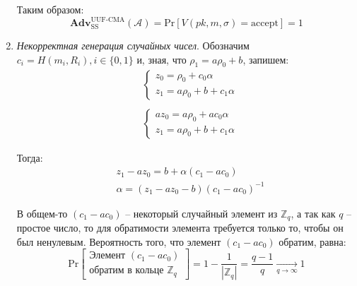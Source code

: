 \documentclass[12pt, a4paper]{extarticle}
\begin{document}
\begin{enumerate}
        Таким образом:
        \begin{equation*}
            \textbf{Adv}_{\text{SS}}^{\text{UUF-CMA}}(\mathcal{A}) = 
                \text{Pr}[V(pk, m, \sigma) = \text{accept}] = 1
        \end{equation*}
        
    \item \textit{Некорректная генерация случайных чисел}. Обозначим $c_i = H(m_i, R_i), 
   		i \in \{0, 1\}$ и, зная, что $\rho_1 = a \rho_0 + b$, запишем:
        \begin{equation*}
            \begin{split}
                & \left\{\begin{array}{l}
                    z_0 = \rho_0 + c_0 \alpha \\
                    z_1 = a \rho_0 + b + c_1 \alpha
                \end{array}\right. \\ \\
                & \left\{\begin{array}{l}
                    a z_0 = a \rho_0 + a c_0 \alpha \\
                    z_1 = a \rho_0 + b + c_1 \alpha
                \end{array}\right.
            \end{split}
        \end{equation*}
        
        Тогда:
        \begin{equation*}
            \begin{split}
                & z_1 - a z_0 = b + \alpha (c_1 - a c_0) \\
                & \alpha = (z_1 - a z_0 - b)(c_1 - a c_0)^{-1}
            \end{split}
        \end{equation*}
        
        В общем-то $(c_1 - a c_0)$ -- некоторый случайный элемент из $\mathbb{Z}_q$, а так как 
        $q$ -- простое число, то для обратимости элемента требуется только то, чтобы он был 
        ненулевым. Вероятность того, что элемент $(c_1 - a c_0)$ обратим, равна:
        \begin{equation*}
            \text{Pr}\left[\begin{array}{c}
                \text{Элемент } (c_1 - a c_0) \\
                \text{обратим в кольце } \mathbb{Z}_q
            \end{array}\right] = 1 - \frac{1}{|\mathbb{Z}_q|} = \frac{q - 1}{q} 
            	\xrightarrow[q \to \infty]{} 1
        \end{equation*}
        

\end{enumerate}
\end{document}
